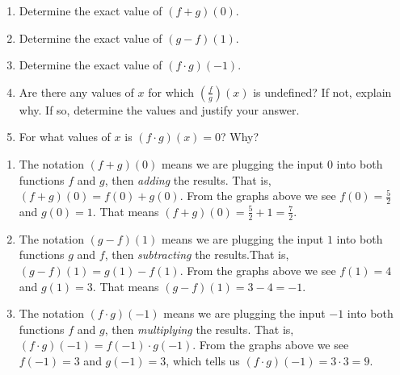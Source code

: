 \documentclass{ximera}
\begin{document}
\begin{example}
\begin{minipage}{.5\textwidth}
\begin{center}
			\end{center}
		\end{minipage}
		\begin{enumerate}
			\item Determine the exact value of $(f+g)(0)$.\\
			\item Determine the exact value of $(g-f)(1)$.\\
			\item Determine the exact value of $(f \cdot g)(-1)$.\\
			\item Are there any values of $x$ for which $\left( \frac{f}{g} \right)(x)$ is undefined?  
				If not, explain why.  If so, determine the values and justify your answer.\\
			\item For what values of $x$ is $(f \cdot g)(x) = 0$?  Why?\\
		\end{enumerate}
		\begin{explanation}
			\begin{enumerate}
				\item The notation $(f+g)(0)$ means we are plugging the input $0$ into both functions $f$ and $g$, then \emph{adding} the results.
					That is, $(f+g)(0) = f(0) + g(0)$. From the graphs above we see $f(0) = \frac{5}{2}$ and $g(0) = 1$. That means
					$(f+g)(0) = \frac{5}{2} + 1 = \frac{7}{2}$.

				\item The notation $(g-f)(1)$ means we are plugging the input $1$ into both functions $g$ and $f$, then \emph{subtracting} the
					 results.That is, $(g-f)(1) = g(1) - f(1)$. From the graphs above we see $f(1) = 4$ and $g(1) = 3$. That means
					$(g-f)(1) = 3 - 4 = -1$.					

				\item The notation $(f\cdot g)(-1)$ means we are plugging the input $-1$ into both functions $f$ and $g$, then \emph{multiplying}
					 the results. That is, $(f\cdot g)(-1) = f(-1) \cdot g(-1)$. 
					 From the graphs above we see $f(-1) = 3$ and $g(-1) = 3$, which tells us 
					$(f\cdot g)(-1) = 3 \cdot 3 = 9$.


\end{enumerate}
\end{explanation}
\end{example}
\end{document}

